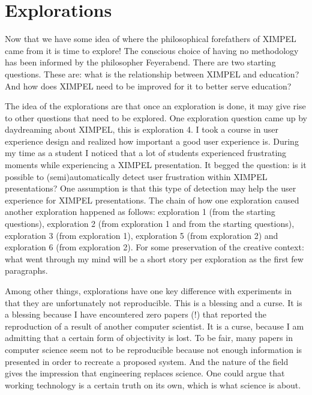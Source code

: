 \chapter{Explorations}
Now that we have some idea of where the philosophical forefathers of XIMPEL came from it is time to explore! The conscious choice of having no methodology has been informed by the philosopher Feyerabend. There are two starting questions. These are: what is the relationship between XIMPEL and education? And how does XIMPEL need to be improved for it to better serve education? 

The idea of the explorations are that once an exploration is done, it may give rise to other questions that need to be explored. One exploration question came up by daydreaming about XIMPEL, this is exploration 4. I took a course in user experience design and realized how important a good user experience is. During my time as a student I noticed that a lot of students experienced frustrating moments while experiencing a XIMPEL presentation. It begged the question: is it possible to (semi)automatically detect user frustration within XIMPEL presentations? One assumption is that this type of detection may help the user experience for XIMPEL presentations. The chain of how one exploration caused another exploration happened as follows: exploration 1 (from the starting questions), exploration 2 (from exploration 1 and from the starting questions), exploration 3 (from exploration 1), exploration 5 (from exploration 2) and exploration 6 (from exploration 2). For some preservation of the creative context: what went through my mind will be a short story per exploration as the first few paragraphs.

Among other things, explorations have one key difference with experiments in that they are unfortunately not reproducible. This is a blessing and a curse. It is a blessing because I have encountered zero papers (!) that reported the reproduction of a result of another computer scientist. It is a curse, because I am admitting that a certain form of objectivity is lost. To be fair, many papers in computer science seem not to be reproducible because not enough information is presented in order to recreate a proposed system. And the nature of the field gives the impression that engineering replaces science. One could argue that working technology is a certain truth on its own, which is what science is about.


